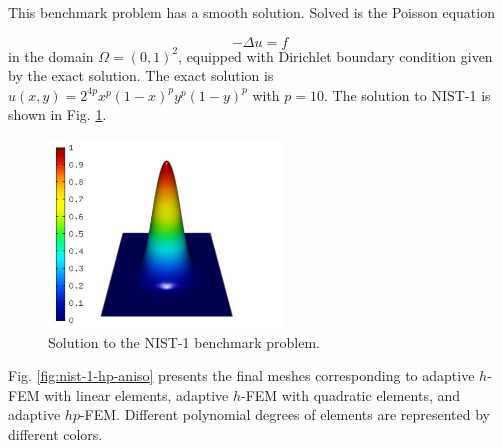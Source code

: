 \documentclass[12pt]{elsarticle}
\begin{document}
This benchmark problem has a smooth solution.
Solved is the Poisson equation

\begin{equation} \label{poisson}
-\Delta u = f
\end{equation}
in the domain $\Omega = (0, 1)^2$, equipped with Dirichlet
boundary condition given by the exact solution.
The exact solution is $u(x, y) = 2^{4p}x^{p}(1-x)^{p}y^{p}(1-y)^{p}$
with $p = 10$.
The solution to NIST-1 is shown in Fig. \ref{fig:sln-nist01}.

\begin{figure}[H]
\centering
\includegraphics[height=5cm]{mafig1.pdf}
\caption{Solution to the NIST-1 benchmark problem.}
\label{fig:sln-nist01}
\end{figure}

Fig. \ref{fig:nist-1-hp-aniso} presents the final meshes corresponding to adaptive $h$-FEM with
linear elements, adaptive $h$-FEM with quadratic elements, and adaptive $hp$-FEM. Different
polynomial degrees of elements are represented by different colors.
\end{document}
